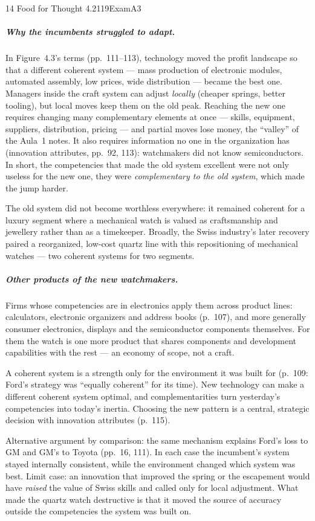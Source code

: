 \begin{exsol}{14}{\MR{} Food for Thought 4.2}{119}{Exam}{A3}
\subparagraph{Why the incumbents struggled to adapt.} In Figure~4.3's terms (pp.~111--113),
technology moved the profit landscape so that a different coherent system --- mass production of
electronic modules, automated assembly, low prices, wide distribution --- became the best one.
Managers inside the craft system can adjust \emph{locally} (cheaper springs, better tooling), but
local moves keep them on the old peak. Reaching the new one requires changing many complementary
elements at once --- skills, equipment, suppliers, distribution, pricing --- and partial moves
lose money, the ``valley'' of the Aula~1 notes. It also requires information no one in the
organization has (innovation attributes, pp.~92, 113): watchmakers did not know semiconductors. In
short, the competencies that made the old system excellent were not only useless for the new one,
they were \emph{complementary to the old system}, which made the jump harder.

The old system did not become worthless everywhere: it remained coherent for a luxury segment
where a mechanical watch is valued as craftsmanship and jewellery rather than as a timekeeper.
Broadly, the Swiss industry's later recovery paired a reorganized, low-cost quartz line with this
repositioning of mechanical watches --- two coherent systems for two segments.

\subparagraph{Other products of the new watchmakers.} Firms whose competencies are in
electronics apply them across product lines: calculators, electronic organizers and address books
(p.~107), and more generally consumer electronics, displays and the semiconductor components
themselves. For them the watch is one more product that shares components and development
capabilities with the rest --- an economy of scope, not a craft.

\interp A coherent system is a strength only for the environment it was built for (p.~109: Ford's
strategy was ``equally coherent'' for its time). New technology can make a different coherent
system optimal, and complementarities turn yesterday's competencies into today's inertia. Choosing
the new pattern is a central, strategic decision with innovation attributes (p.~115).

\verify Alternative argument by comparison: the same mechanism explains Ford's loss to GM and
GM's to Toyota (pp.~16, 111). In each case the incumbent's system stayed internally consistent,
while the environment changed which system was best. Limit case: an innovation that improved the
spring or the escapement would have \emph{raised} the value of Swiss skills and called only for
local adjustment. What made the quartz watch destructive is that it moved the source of accuracy
outside the competencies the system was built on.


\end{exsol}
